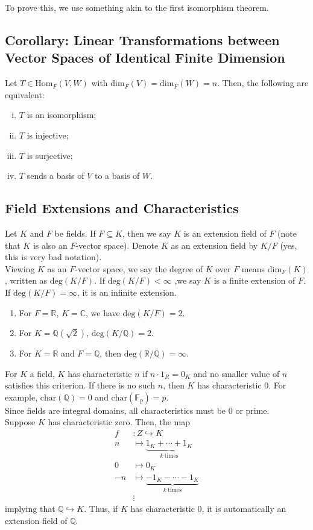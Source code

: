 \documentclass[10pt]{extarticle}
\newcommand{\Q}{\mathbb{Q}}
\newcommand{\R}{\mathbb{R}}
\begin{document}
  To prove this, we use something akin to the first isomorphism theorem.
  \subsection{Corollary: Linear Transformations between Vector Spaces of Identical Finite Dimension}%
  Let $T\in \text{Hom}_F(V,W)$ with $\text{dim}_F(V) = \text{dim}_F(W) = n$. Then, the following are equivalent:
  \begin{enumerate}[(i)]
    \item $T$ is an isomorphism;
    \item $T$ is injective;
    \item $T$ is surjective;
    \item $T$ sends a basis of $V$ to a basis of $W$.
  \end{enumerate}
  \subsection{Field Extensions and Characteristics}%
  Let $K$ and $F$ be fields. If $F\subseteq K$, then we say $K$ is an extension field of $F$ (note that $K$ is also an $F$-vector space). Denote $K$ as an extension field by $K/F$ (yes, this is very bad notation).\\

  Viewing $K$ as an $F$-vector space, we say the degree of $K$ over $F$ means $\text{dim}_F(K)$, written as $\text{deg}(K/F)$. If $\text{deg}(K/F) < \infty$ ,we say $K$ is a finite extension of $F$. If $\text{deg}(K/F) = \infty$, it is an infinite extension.
  \begin{enumerate}[(1)]
    \item For $F = \R$, $K = \mathbb{C}$, we have $\text{deg}(K/F) = 2$.
    \item For $K = \Q(\sqrt{2})$, $\text{deg}(K/\Q) = 2$.
    \item For $K = \R$ and $F = \Q$, then $\text{deg}(\R/\Q) = \infty$.
  \end{enumerate}
  For $K$ a field, $K$ has characteristic $n$ if $n\cdot 1_R = 0_K$ and no smaller value of $n$ satisfies this criterion. If there is no such $n$, then $K$ has characteristic $0$. For example, $\text{char}(\Q) = 0$ and $\text{char}(\mathbb{F}_p) = p$.\\

  Since fields are integral domains, all characteristics must be $0$ or prime.\\

  Suppose $K$ has characteristic zero. Then, the map
  \begin{align*}
    f&: Z\hookrightarrow K\\
    n&\mapsto \underbrace{1_K + \cdots + 1_K}_{k~\text{times}}\\
    0 &\mapsto 0_K\\
    -n &\mapsto \underbrace{-1_K - \cdots - 1_K}_{k~\text{times}}\\
       &\vdots
  \end{align*}
  implying that $\Q\hookrightarrow K$. Thus, if $K$ has characteristic $0$, it is automatically an extension field of $\Q$.\\
\end{document}
